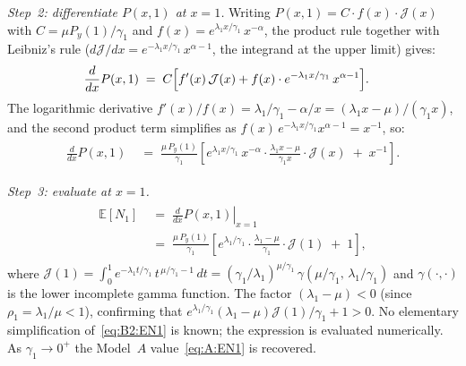 \medskip\noindent\textit{Step~2: differentiate $P(x,1)$ at $x=1$.}\enspace
Writing $P(x,1)=C\cdot f(x)\cdot\mathcal{J}(x)$ with $C=\mu P_y(1)/\gamma_1$ and
$f(x)=e^{\lambda_1 x/\gamma_1}\,x^{-\alpha}$, the product rule together with
Leibniz's rule ($d\mathcal{J}/dx = e^{-\lambda_1 x/\gamma_1}\,x^{\alpha-1}$, the integrand
at the upper limit) gives:
\begin{align}
    \begin{split}
        \frac{d}{dx}P(x,1)
        &\;=\; C\Bigl[f'(x)\,\mathcal{J}(x)+f(x)\cdot e^{-\lambda_1 x/\gamma_1}\,x^{\alpha-1}\Bigr].
    \end{split}
\end{align}
The logarithmic derivative $f'(x)/f(x)=\lambda_1/\gamma_1-\alpha/x=(\lambda_1 x-\mu)/(\gamma_1 x)$,
and the second product term simplifies as
$f(x)\,e^{-\lambda_1 x/\gamma_1}x^{\alpha-1}=x^{-1}$, so:
\begin{align}
    \begin{split}
        \frac{d}{dx}P(x,1)
        &\;=\; \frac{\mu\,P_y(1)}{\gamma_1}\left[
            e^{\lambda_1 x/\gamma_1}\,x^{-\alpha}\cdot\frac{\lambda_1 x-\mu}{\gamma_1 x}
            \cdot\mathcal{J}(x)
            \;+\; x^{-1}
        \right].
    \end{split}
\end{align}

\medskip\noindent\textit{Step~3: evaluate at $x=1$.}\enspace
\begin{align}
    \begin{split}
        \mathbb{E}[N_1]
        &\;=\; \left.\frac{d}{dx}P(x,1)\right|_{x=1} \\
        &\;=\; \frac{\mu\,P_y(1)}{\gamma_1}\left[
            e^{\lambda_1/\gamma_1}\cdot\frac{\lambda_1-\mu}{\gamma_1}
            \cdot\mathcal{J}(1)
            \;+\; 1
        \right],
    \end{split}
    \label{eq:B2:EN1}
\end{align}
where $\mathcal{J}(1)=\int_0^1 e^{-\lambda_1 t/\gamma_1}\,t^{\,\mu/\gamma_1-1}\,dt
=(\gamma_1/\lambda_1)^{\mu/\gamma_1}\,\gamma(\mu/\gamma_1,\,\lambda_1/\gamma_1)$
and $\gamma(\cdot,\cdot)$ is the lower incomplete gamma function.  The
factor $(\lambda_1-\mu)<0$ (since $\rho_1=\lambda_1/\mu<1$), confirming that
$e^{\lambda_1/\gamma_1}(\lambda_1-\mu)\mathcal{J}(1)/\gamma_1 + 1 > 0$.
No elementary simplification of~\eqref{eq:B2:EN1} is known; the expression
is evaluated numerically.  As $\gamma_1\to0^+$ the
Model~$A$ value~\eqref{eq:A:EN1} is recovered.

